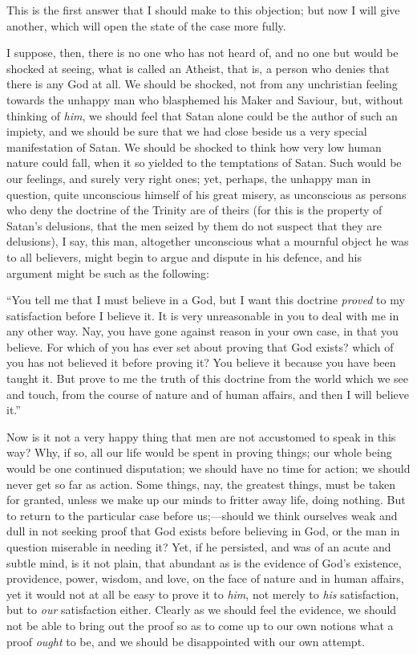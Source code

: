 This is the first answer that I should make to this objection; but
now I will give another, which will open the state of the case more
fully.

I suppose, then, there is no one who has not heard of, and no one
but would be shocked at seeing, what is called an Atheist, that is, a
person who denies that there is any God at all. We should be shocked,
not from any unchristian feeling towards the unhappy man who
blasphemed his Maker and Saviour, but, without thinking of \emph{him},
we should feel that Satan alone could be the author of such an
impiety, and we should be sure that we had close beside us a very
special manifestation of Satan. We should be shocked to think how very
low human nature could fall, when it so yielded to the temptations of
Satan. Such would be our feelings, and surely very right ones; yet,
perhaps, the unhappy man in question, quite unconscious himself of his
great misery, as unconscious as persons who deny the doctrine of the
Trinity are of theirs (for this is the property of Satan's delusions,
that the men seized by them do not suspect that they are delusions), I
say, this man, altogether unconscious what a mournful object he was to
all believers, might begin to argue and dispute in his defence, and
his argument might be such as the following:

``You tell me that I must believe in a God, but I want this
doctrine \emph{proved} to my satisfaction before I believe it. It is
very unreasonable in you to deal with me in any other way. Nay, you
have gone against reason in your own case, in that you believe. For
which of you has ever set about proving that God exists? which of you
has not believed it before proving it? You believe it because you have
been taught it. But prove to me the truth of this doctrine from the
world which we see and touch, from the course of nature and of human
affairs, and then I will believe it.''

Now is it not a very happy thing that men are not accustomed to
speak in this way? Why, if so, all our life would be spent in proving
things; our whole being would be one continued disputation; we should
have no time for action; we should never get so far as action. Some
things, nay, the greatest things, must be taken for granted, unless we
make up our minds to fritter away life, doing nothing. But to return
to the particular case before us;—should we think ourselves weak and
dull in not seeking proof that God exists before believing in God, or
the man in question miserable in needing it? Yet, if he persisted, and
was of an acute and subtle mind, is it not plain, that abundant as is
the evidence of God's existence, providence, power, wisdom, and love,
on the face of nature and in human affairs, yet it would not at all be
easy to prove it to \emph{him}, not merely to \emph{his} satisfaction,
but to \emph{our} satisfaction either. Clearly as we should feel the
evidence, we should not be able to bring out the proof so as to come
up to our own notions what a proof \emph{ought} to be, and we should
be disappointed with our own attempt.

